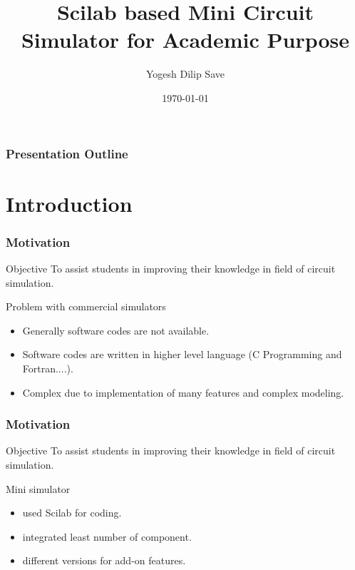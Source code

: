 \documentclass{beamer}
\title
{Scilab based Mini Circuit Simulator for Academic Purpose}
\author[]
{Yogesh Dilip Save}
\institute
{
  Indian Institute of Technology, Bombay
}
\date[seminar] %
{\today}
\begin{document}
\begin{frame}
  \titlepage
\end{frame}
\begin{frame}
  \frametitle{Presentation Outline}
  \tableofcontents
\end{frame}

\section{Introduction}
\begin{frame}
 \frametitle{Motivation}
\begin{block}{Objective}
To assist students in improving their knowledge in field of circuit simulation.
\end{block}
\begin{block}{Problem with commercial simulators}
\begin{itemize}
\item Generally software codes are not available.
\item Software codes are written in higher level language (C Programming and Fortran....).
\item Complex due to implementation of many features and complex modeling.
\end{itemize}
\end{block}
\end{frame}

\begin{frame}
 \frametitle{Motivation}
\begin{block}{Objective}
To assist students in improving their knowledge in field of circuit simulation.
\end{block}
\begin{block}{Mini simulator}
\begin{itemize}
\item used Scilab for coding.
\item integrated least number of component.  
\item different versions for add-on features. 
\end{itemize} 
\end{block}
\end{frame}
\end{document}
